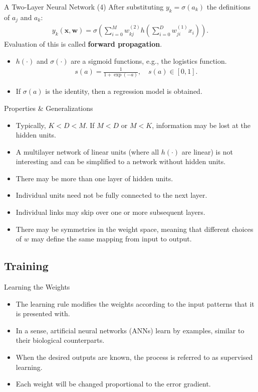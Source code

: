 \documentclass[10pt, hyperref={colorlinks = true,linkcolor = blue}]{beamer}
\begin{document}
{{\begin{frame}{A Two-Layer Neural Network (4)}
After substituting $y_k = \sigma(a_k)$ the definitions of $a_j$ and $a_k:$
\begin{align*}
y_k(\bm x, \bm w) = \sigma\left(\sum_{i=0}^{M} w_{kj}^{(2)} h\left(\sum_{i=0}^{D} w_{ji}^{(1)} x_i \right) \right).
\end{align*}
Evaluation of this is called \textbf{forward propagation}.
\begin{itemize}
\item $h(\cdot)$ and $\sigma(\cdot)$ are a sigmoid functions, e.g.,  the logistics function.
\begin{align*}
s(a) = \frac{1}{1+ \exp(-a)}, \quad s(a) \in [0,1].
\end{align*}
\item If $\sigma(a)$ is the identity, then a regression model is obtained.
\end{itemize}
\end{frame}



\begin{frame}{Properties \& Generalizations}
\begin{itemize}
    \item Typically, \( K < D < M \). If \( M < D \) or \( M < K \), information may be lost at the hidden units.
    \item A multilayer network of linear units (where all \( h(\cdot) \) are linear) is not interesting and can be simplified to a network without hidden units.
    \item There may be more than one layer of hidden units.
    \item Individual units need not be fully connected to the next layer.
    \item Individual links may skip over one or more subsequent layers.
    \item There may be symmetries in the weight space, meaning that different choices of \( w \) may define the same mapping from input to output.
\end{itemize}
\end{frame}

{\subsection{Training}

\begin{frame}{Learning the Weights}
\begin{itemize}
    \item The learning rule modifies the weights according to the input patterns that it is presented with.
    \item In a sense, artificial neural networks (ANNs) learn by examples, similar to their biological counterparts.
    \item When the desired outputs are known, the process is referred to as supervised learning.
    \item Each weight will be changed proportional to the error gradient.
\end{itemize}
\end{frame}

}}}
\end{document}
